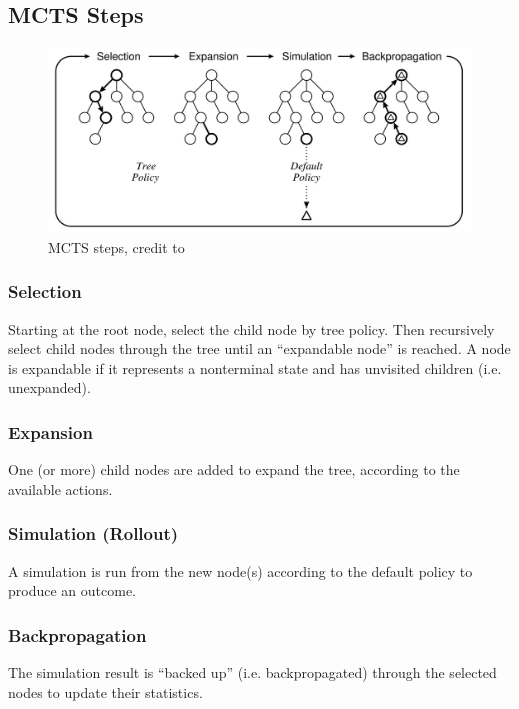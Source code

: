 \subsection{MCTS Steps}

\begin{figure}
  \begin{center}
    \includegraphics[width=\textwidth]{images/mcts-steps.jpg}
  \end{center}
  \caption{MCTS steps, credit to \cite{mcts-survey}}
  \label{fig:mcts-steps}
\end{figure}

\subsubsection{Selection}
Starting at the root node, select the child node by tree policy. Then recursively select child nodes through the tree until an ``expandable node'' is reached. A node is expandable if it represents a nonterminal state and has unvisited children (i.e. unexpanded).

\subsubsection{Expansion}
One (or more) child nodes are added to expand the tree, according to the available actions.

\subsubsection{Simulation (Rollout)}
A simulation is run from the new node(s) according to the default policy to produce an outcome.
\subsubsection{Backpropagation}
The simulation result is ``backed up'' (i.e. backpropagated) through the selected nodes to update their statistics.

